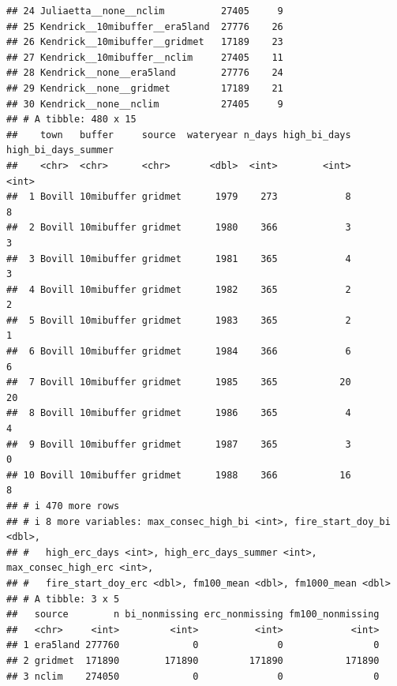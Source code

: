 \documentclass[
]{article}
\begin{document}
\begin{verbatim}
## 24 Juliaetta__none__nclim          27405     9
## 25 Kendrick__10mibuffer__era5land  27776    26
## 26 Kendrick__10mibuffer__gridmet   17189    23
## 27 Kendrick__10mibuffer__nclim     27405    11
## 28 Kendrick__none__era5land        27776    24
## 29 Kendrick__none__gridmet         17189    21
## 30 Kendrick__none__nclim           27405     9
## # A tibble: 480 x 15
##    town   buffer     source  wateryear n_days high_bi_days high_bi_days_summer
##    <chr>  <chr>      <chr>       <dbl>  <int>        <int>               <int>
##  1 Bovill 10mibuffer gridmet      1979    273            8                   8
##  2 Bovill 10mibuffer gridmet      1980    366            3                   3
##  3 Bovill 10mibuffer gridmet      1981    365            4                   3
##  4 Bovill 10mibuffer gridmet      1982    365            2                   2
##  5 Bovill 10mibuffer gridmet      1983    365            2                   1
##  6 Bovill 10mibuffer gridmet      1984    366            6                   6
##  7 Bovill 10mibuffer gridmet      1985    365           20                  20
##  8 Bovill 10mibuffer gridmet      1986    365            4                   4
##  9 Bovill 10mibuffer gridmet      1987    365            3                   0
## 10 Bovill 10mibuffer gridmet      1988    366           16                   8
## # i 470 more rows
## # i 8 more variables: max_consec_high_bi <int>, fire_start_doy_bi <dbl>,
## #   high_erc_days <int>, high_erc_days_summer <int>, max_consec_high_erc <int>,
## #   fire_start_doy_erc <dbl>, fm100_mean <dbl>, fm1000_mean <dbl>
## # A tibble: 3 x 5
##   source        n bi_nonmissing erc_nonmissing fm100_nonmissing
##   <chr>     <int>         <int>          <int>            <int>
## 1 era5land 277760             0              0                0
## 2 gridmet  171890        171890         171890           171890
## 3 nclim    274050             0              0                0
\end{verbatim}
\end{document}
